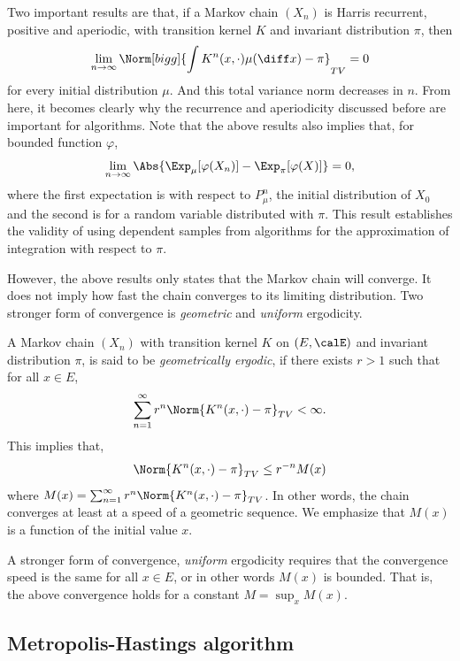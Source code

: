 Two important results are that, if a Markov chain $(X_n)$ is Harris recurrent,
positive and aperiodic, with transition kernel $K$ and invariant distribution
$\pi$, then
\begin{equation}
  \lim_{n\to\infty}\Norm[bigg]{
    \int K^n(x,\cdot)\mu(\diff x) - \pi}_{TV} = 0
\end{equation}
for every initial distribution $\mu$. And this total variance norm decreases
in $n$. From here, it becomes clearly why the recurrence and aperiodicity
discussed before are important for \mcmc algorithms. Note that the above
results also implies that, for bounded function $\varphi$,
\begin{equation}
  \lim_{n\to\infty}\Abs{\Exp_{\mu}[\varphi(X_n)] - \Exp_{\pi}[\varphi(X)]}
  = 0,
\end{equation}
where the first expectation is with respect to $P_{\mu}^n$, the initial
distribution of $X_0$ and the second is for a random variable distributed with
$\pi$. This result establishes the validity of using dependent samples from
\mcmc algorithms for the approximation of integration with respect to $\pi$.

However, the above results only states that the Markov chain will converge. It
does not imply how fast the chain converges to its limiting distribution. Two
stronger form of convergence is \emph{geometric} and \emph{uniform}
ergodicity.

A Markov chain $(X_n)$ with transition kernel $K$ on $(E,\calE)$ and invariant
distribution $\pi$, is said to be \emph{geometrically ergodic}, if there
exists $r > 1$ such that for all $x\in E$,
\begin{equation}
  \sum_{n=1}^{\infty} r^n\Norm{K^n(x,\cdot)-\pi}_{TV} <\infty.
\end{equation}
This implies that,
\begin{equation}
  \Norm{K^n(x,\cdot)-\pi}_{TV}\le r^{-n}M(x)
\end{equation}
where $M(x) = \sum_{n=1}^{\infty} r^n\Norm{K^n(x,\cdot)-\pi}_{TV}$. In other
words, the chain converges at least at a speed of a geometric sequence. We
emphasize that $M(x)$ is a function of the initial value $x$.

A stronger form of convergence, \emph{uniform} ergodicity requires that the
convergence speed is the same for all $x\in E$, or in other words $M(x)$ is
bounded. That is, the above convergence holds for a constant $M = \sup_x
M(x)$.

\subsection{Metropolis-Hastings algorithm}
\label{sub:Metropolis-Hastings algorithm}

